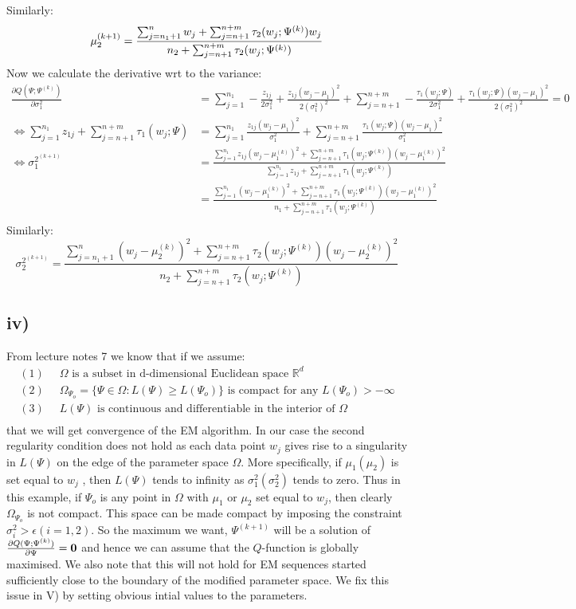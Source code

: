 \documentclass{article}
\begin{document}
Similarly:
$$\mu_2^{(k+1)}=\frac{\sum_{j=n_1+1}^{n}w_j+\sum_{j=n+1}^{n+m}\tau_{2}(w_j;\Psi^{(k)})w_j}{n_2+\sum_{j=n+1}^{n+m}\tau_{2}(w_j;\Psi^{(k)})}\\$$
Now we calculate the derivative wrt to the variance:
\begin{align*}
\frac{\partial Q(\Psi;\Psi^{(k)})}{\partial\sigma_1^2}&=\sum_{j=1}^{n_1}-\frac{z_{1j}}{2\sigma_1^2}+\frac{z_{1j}(w_j-\mu_1)^2}{2(\sigma_1^2)^2}+\sum_{j=n+1}^{n+m}-\frac{\tau_{1}(w_j;\Psi)}{2\sigma_1^2}+\frac{\tau_{1}(w_j;\Psi)(w_j-\mu_1)^2}{2(\sigma_1^2)^2}=0\\
\iff\sum_{j=1}^{n_1}z_{1j}+\sum_{j=n+1}^{n+m}\tau_{1}(w_j;\Psi)&=\sum_{j=1}^{n_1}\frac{z_{1j}(w_j-\mu_1)^2}{\sigma_1^2}+\sum_{j=n+1}^{n+m}\frac{\tau_{1}(w_j;\Psi)(w_j-\mu_1)^2}{\sigma_1^2}\\
\iff\sigma_1^{2^{(k+1)}}&=\frac{\sum_{j=1}^{n_1}z_{1j}(w_j-\mu_1^{(k)})^2+\sum_{j=n+1}^{n+m}\tau_{1}(w_j;\Psi^{(k)})(w_j-\mu_1^{(k)})^2}{\sum_{j=1}^{n_1}z_{1j}+\sum_{j=n+1}^{n+m}\tau_{1}(w_j;\Psi^{(k)})}\\
&=\frac{\sum_{j=1}^{n_1}(w_j-\mu_1^{(k)})^2+\sum_{j=n+1}^{n+m}\tau_{1}(w_j;\Psi^{(k)})(w_j-\mu_1^{(k)})^2}{n_1+\sum_{j=n+1}^{n+m}\tau_{1}(w_j;\Psi^{(k)})}\\
\end{align*}
Similarly:
$$\sigma_2^{2^{(k+1)}}=\frac{\sum_{j=n_1+1}^{n}(w_j-\mu_2^{(k)})^2+\sum_{j=n+1}^{n+m}\tau_{2}(w_j;\Psi^{(k)})(w_j-\mu_2^{(k)})^2}{n_2+\sum_{j=n+1}^{n+m}\tau_{2}(w_j;\Psi^{(k)})}$$
\subsection*{iv)}
From lecture notes 7 we know that if we assume:
\begin{align*}
(1)&\;\;\Omega\text{ is a subset in d-dimensional Euclidean space }\mathbb{R}^d\\
(2)&\;\;\Omega_{\Psi_{o}}=\{\Psi\in\Omega:L(\Psi)\geq L(\Psi_{o})\}\text{ is compact for any }L(\Psi_{o})>-\infty\\
(3)&\;\;L(\Psi)\text{ is continuous and differentiable in the interior of }\Omega\\
\end{align*}
that we will get convergence of the EM algorithm. In our case the second regularity condition does not hold as each data point $w_j$ gives rise to a singularity in $L(\Psi)$ on the edge of the parameter space $\Omega$. More specifically, if $\mu_1(\mu_2)$ is set equal to $w_j$ , then $L(\Psi)$ tends to infinity as $\sigma_1^2(\sigma_2^2)$ tends to zero. Thus in this example, if $\Psi_{o}$ is any point in $\Omega$ with $\mu_1$ or $\mu_2$ set equal to $w_j$, then clearly $\Omega_{\Psi_{o}}$ is not compact. This space can be made compact by imposing the constraint $\sigma_i^2>\epsilon (i = 1, 2)$. So the maximum we want, $\Psi^{(k+1)}$ will be a solution of $\frac{\partial Q(\Psi;\Psi^{(k)})}{\partial\Psi}=\bold{0}$ and hence we can assume that the $Q$-function is globally maximised. We also note that this will not hold for EM sequences started sufficiently close to the boundary of the modified parameter space. We fix this issue in V) by setting obvious intial values to the parameters.
\end{document}
